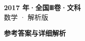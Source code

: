 \documentclass[zihao=-4, a4paper]{ctexart}
\begin{document}
\begin{center}
  {\Large\bfseries 2017 年·全国Ⅲ卷·文科}\\[4pt]
  {\large 数学 · 解析版}
\end{center}
\medskip
{}

\clearpage
{}
\begin{center}{\Large\bfseries 参考答案与详细解析}\end{center}
\medskip

\end{document}
